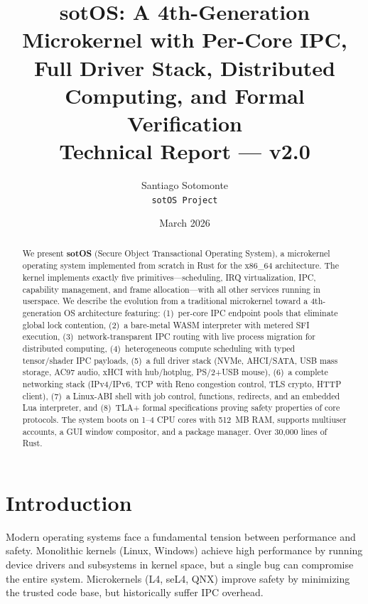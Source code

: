 \documentclass[11pt,letterpaper]{article}
\title{\textbf{sotOS: A 4th-Generation Microkernel with Per-Core IPC,\\
Full Driver Stack, Distributed Computing, and Formal Verification}\\[0.5em]
\large Technical Report --- v2.0}
\author{Santiago Sotomonte\\
\texttt{sotOS Project}}
\date{March 2026}
\theoremstyle{definition}
\begin{document}
\maketitle

\begin{abstract}
We present \textbf{sotOS} (Secure Object Transactional Operating System), a
microkernel operating system implemented from scratch in Rust for the x86\_64
architecture. The kernel implements exactly five primitives---scheduling, IRQ
virtualization, IPC, capability management, and frame allocation---with all
other services running in userspace. We describe the evolution from a
traditional microkernel toward a 4th-generation OS architecture featuring:
(1)~per-core IPC endpoint pools that eliminate global lock contention,
(2)~a bare-metal WASM interpreter with metered SFI execution,
(3)~network-transparent IPC routing with live process migration for distributed computing,
(4)~heterogeneous compute scheduling with typed tensor/shader IPC payloads,
(5)~a full driver stack (NVMe, AHCI/SATA, USB mass storage, AC97 audio, xHCI with hub/hotplug, PS/2+USB mouse),
(6)~a complete networking stack (IPv4/IPv6, TCP with Reno congestion control, TLS crypto, HTTP client),
(7)~a Linux-ABI shell with job control, functions, redirects, and an embedded Lua interpreter, and
(8)~TLA+ formal specifications proving safety properties of core protocols.
The system boots on 1--4 CPU cores with 512~MB RAM, supports multiuser accounts,
a GUI window compositor, and a package manager. Over 30,000 lines of Rust.
\end{abstract}

\tableofcontents
\newpage

\section{Introduction}

Modern operating systems face a fundamental tension between performance and
safety. Monolithic kernels (Linux, Windows) achieve high performance by running
device drivers and subsystems in kernel space, but a single bug can compromise
the entire system. Microkernels (L4, seL4, QNX) improve safety by minimizing
the trusted code base, but historically suffer IPC overhead.
\end{document}
